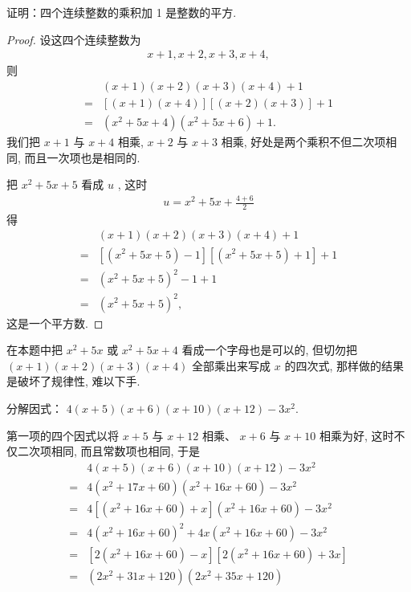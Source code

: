 \begin{example}
	证明：四个连续整数的乘积加 1 是整数的平方.
\end{example}
\begin{proof}
	设这四个连续整数为
	\begin{align*}
		x+1, x+2, x+3, x+4,
	\end{align*}
	则
	\begin{align*}
		  & (x+1)(x+2)(x+3)(x+4)+1                               \\
		= & {[(x+1)(x+4)][(x+2)(x+3)]+1 }                        \\
		= & \left(x^{2}+5 x+4\right)\left(x^{2}+5 x+6\right)+1 .
	\end{align*}
	我们把 $x+1$ 与 $x+4$ 相乘,  $x+2$ 与 $x+3$ 相乘, 好处是两个乘积不但二次项相同, 而且一次项也是相同的.

	把 $x^{2}+5 x+5$ 看成 $u$ , 这时
	\begin{align*}
		u=x^{2}+5 x+\frac{4+6}{2}
	\end{align*}
	得
	\begin{align*}
		  & (x+1)(x+2)(x+3)(x+4)+1                                                              \\
		= & {\left[\left(x^{2}+5 x+5\right)-1\right]\left[\left(x^{2}+5 x+5\right)+1\right]+1 } \\
		= & \left(x^{2}+5 x+5\right)^{2}-1+1                                                    \\
		= & \left(x^{2}+5 x+5\right)^{2},
	\end{align*}
	这是一个平方数.
\end{proof}
\begin{note}
	在本题中把 $x^{2}+5 x$ 或 $x^{2}+5 x+4$ 看成一个字母也是可以的, 但切勿把 $(x+1)(x+2)(x+3)(x+4)$ 全部乘出来写成 $x$ 的四次式, 那样做的结果是破坏了规律性, 难以下手.
\end{note}

\begin{example}
	分解因式： $4(x+5)(x+6)(x+10)(x+12)-3 x^{2}.$
\end{example}
\begin{solution}
	第一项的四个因式以将 $x+5$ 与 $x+12$ 相乘、 $x+6$ 与 $x+10$ 相乘为好, 这时不仅二次项相同, 而且常数项也相同, 于是
	\begin{align*}
		  & 4(x+5)(x+6)(x+10)(x+12)-3 x^{2}                                                           \\
		= & 4\left(x^{2}+17 x+60\right)\left(x^{2}+16 x+60\right)-3 x^{2}                             \\
		= & 4\left[\left(x^{2}+16 x+60\right)+x\right]\left(x^{2}+16 x+60\right)-3 x^{2}              \\
		= & 4\left(x^{2}+16 x+60\right)^{2}+4 x\left(x^{2}+16 x+60\right)-3 x^{2}                     \\
		= & {\left[2\left(x^{2}+16 x+60\right)-x\right]\left[2\left(x^{2}+16 x+60\right)+3 x\right] } \\
		= & \left(2 x^{2}+31 x+120\right)\left(2 x^{2}+35 x+120\right)
	\end{align*}
\end{solution}


